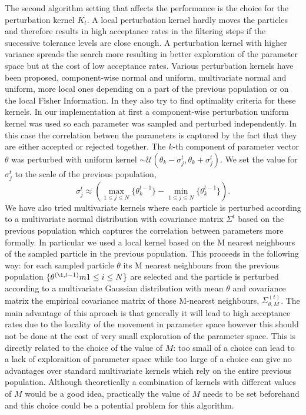 The second algorithm setting that affects the performance is the choice for the perturbation kernel $K_{t}$. A local perturbation kernel hardly moves the particles and therefore results in high acceptance rates in the filtering steps if the successive tolerance levels are close enough.  A perturbation kernel with higher variance spreads the search more resulting in better exploration of the parameter space but at the cost of low acceptance rates. Various perturbation kernels have been proposed, component-wise normal and uniform, multivariate normal and uniform, more local ones depending on a part of the previous population or on the local Fisher Information. In \cite[] {filippi2011optimal} they also try to find optimality criteria for these kernels. In our implementation at first a component-wise perturbation uniform kernel was used so each parameter was sampled and perturbed independently. In this case the correlation betwen the parameters is captured by the fact that they are either accepted or rejected together. The $k$-th component of parameter vector $\theta$ was perturbed with uniform kernel $\sim \mathcal{U}(\theta_{k}-\sigma_{j}^{t}, \theta_{k}+\sigma_{j}^{t})$.  We set the value for $\sigma_{j}^{t}$ to the scale of the previous population,
\begin{equation}
\sigma_{j}^{t} \approx ( \underset{1 \le j \le N}{\max}\{\theta_{k}^{t-1}\} - \underset{1 \le j \le N}{\min}\{\theta_{k}^{t-1}\}).
\end{equation} 
We have also tried multivariate kernels where each particle is perturbed according to a multivariate normal distribution with covariance matrix $\Sigma^t$ based on the previous population which captures the correlation between parameters more formally. In particular we used a local kernel based on the M nearest neighbours of the sampled particle in the previous population. This proceeds in the following way: for each sampled particle $\theta$ its M nearest neighbours from the previous population $\{ \theta^{(\i, t-1)}m 1 \le i \le N\}$ are selected and the particle is perturbed according to a multivariate Gaussian distribution with mean $\theta$ and covariance matrix the empirical covariance matrix of those M-nearest neighbours, $\Sigma_{\theta, M}^{(t)}$. The main advantage of this aproach is that generally it will lead to high acceptance rates due to the locality of the movement in parameter space however this should not be done at the cost of very small exploration of the parameter space. This is directly related to the choice of the value of $M$: too small of a choice can lead to a lack of exploraition of parameter space while too large of a choice can give no advantages over standard multivariate kernels which rely on the entire previous population. Although theoretically a combination of kernels with different values of $M$ would be a good idea, practically the value of $M$ needs to be set beforehand and this choice could be a potential problem for this algorithm.

